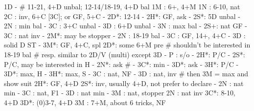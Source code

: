 1D -  # 11-21, 4+D unbal; 12-14/18-19, 4+D bal
1M : 6+, 4+M
1N : 6-10, nat
2C : inv, 6+C [3C]; or GF, 5+C
   - 2D*: 12-14
        - 2H*: GF, ask
             - 2S*: 5D unbal
             - 2N : min bal
             - 3C : 3+C unbal
             - 3D : 6+D unbal
             - 3N : max bal
        - 2S+: nat GF
        - 3C : nat inv
   - 2M*: may be stopper
   - 2N : 18-19 bal
   - 3C : GF, 14+, 4+C
   - 3D : solid D ST
   - 3M*: GF, 4+C, spl
2D*: some 6+M pre  # shouldn't be interested in 18-19 bal
   # resp. similar to 2D/V (multi) except 3D
   - P  : s/o
   - 2H*: P/C
   - 2S*: P/C, may be interested in H
   - 2N*: ask  # 
        - 3C*: min
             - 3D*: ask
             - 3H*: P/C
        - 3D*: max, H
        - 3H*: max, S
   - 3C : nat, NF
   - 3D : nat, inv  # then 3M = max and show suit
2H*: GF, 4+D
2S*: inv, usually 4+D, not prefer to declare
   - 2N : nat min
   - 3C : nat, F1
   - 3D : nat min
   - 3M : nat, stopper
2N : nat inv
3C*: 8-10, 4+D
3D*: (0)3-7, 4+D
3M : 7+M, about 6 tricks, NF